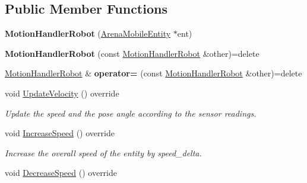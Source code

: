 \subsection*{Public Member Functions}
\begin{DoxyCompactItemize}
\item 
{\bfseries Motion\+Handler\+Robot} (\hyperlink{classArenaMobileEntity}{Arena\+Mobile\+Entity} $\ast$ent)\hypertarget{classMotionHandlerRobot_a4b52a0b181837a8d63c39f71811d691b}{}\label{classMotionHandlerRobot_a4b52a0b181837a8d63c39f71811d691b}

\item 
{\bfseries Motion\+Handler\+Robot} (const \hyperlink{classMotionHandlerRobot}{Motion\+Handler\+Robot} \&other)=delete\hypertarget{classMotionHandlerRobot_a320264d598d6ac90ebd2071c8cb5553f}{}\label{classMotionHandlerRobot_a320264d598d6ac90ebd2071c8cb5553f}

\item 
\hyperlink{classMotionHandlerRobot}{Motion\+Handler\+Robot} \& {\bfseries operator=} (const \hyperlink{classMotionHandlerRobot}{Motion\+Handler\+Robot} \&other)=delete\hypertarget{classMotionHandlerRobot_ae19c3efd7557bc3f0e3b50a1931a7e99}{}\label{classMotionHandlerRobot_ae19c3efd7557bc3f0e3b50a1931a7e99}

\item 
void \hyperlink{classMotionHandlerRobot_acd2cdb615d806dcf809142e84569ca9d}{Update\+Velocity} () override
\begin{DoxyCompactList}\small\item\em Update the speed and the pose angle according to the sensor readings. \end{DoxyCompactList}\item 
void \hyperlink{classMotionHandlerRobot_a93ea16501b7b8c0bd78edb2681aa3b6d}{Increase\+Speed} () override\hypertarget{classMotionHandlerRobot_a93ea16501b7b8c0bd78edb2681aa3b6d}{}\label{classMotionHandlerRobot_a93ea16501b7b8c0bd78edb2681aa3b6d}

\begin{DoxyCompactList}\small\item\em Increase the overall speed of the entity by speed\+\_\+delta. \end{DoxyCompactList}\item 
void \hyperlink{classMotionHandlerRobot_a89e9b8b4e22fb021d7d67c817e66b7b2}{Decrease\+Speed} () override\hypertarget{classMotionHandlerRobot_a89e9b8b4e22fb021d7d67c817e66b7b2}{}\label{classMotionHandlerRobot_a89e9b8b4e22fb021d7d67c817e66b7b2}


\end{DoxyCompactItemize}
